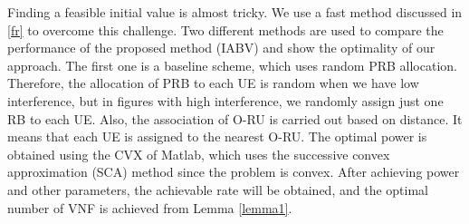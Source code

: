 \documentclass[lettersize,journal]{IEEEtran}
\begin{document}
Finding a feasible initial value is almost tricky. We use a fast method discussed in \ref{fr} to overcome this challenge. 
Two different methods are used to compare the performance of the proposed method (IABV) and show the optimality of our approach.
The first one is a baseline scheme, which uses random PRB allocation. Therefore, the allocation of PRB to each UE is random when we have low interference, but in figures with high interference, we randomly assign just one RB to each UE. Also, the association of O-RU is carried out based on distance. It means that each UE is assigned to the nearest O-RU. The optimal power is obtained using the CVX of Matlab, which uses the successive convex approximation (SCA) method since the problem is convex.
After achieving power and other parameters, the achievable rate will be obtained, and the optimal number of VNF is achieved from Lemma \eqref{lemma1}.
\begin{table}%
 \caption {Simulation Parameters} \label{table:1a}
 \begin{center}
 \vspace*{-1.em}
 \end{center}
 \end{table}
\end{document}
